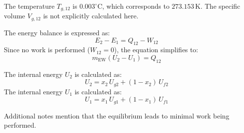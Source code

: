 The temperature \( T_{g,12} \) is \( 0.003^\circ\text{C} \), which corresponds to \( 273.153 \, \text{K} \).  
The specific volume \( V_{g,12} \) is not explicitly calculated here.  

The energy balance is expressed as:  
\[
E_2 - E_1 = Q_{12} - W_{12}
\]  
Since no work is performed (\( W_{12} = 0 \)), the equation simplifies to:  
\[
m_{\text{EW}} (U_2 - U_1) = Q_{12}
\]  

The internal energy \( U_2 \) is calculated as:  
\[
U_2 = x_2 \, U_{g2} + (1 - x_2) \, U_{f2}
\]  
The internal energy \( U_1 \) is calculated as:  
\[
U_1 = x_1 \, U_{g1} + (1 - x_1) \, U_{f1}
\]  

Additional notes mention that the equilibrium leads to minimal work being performed.
